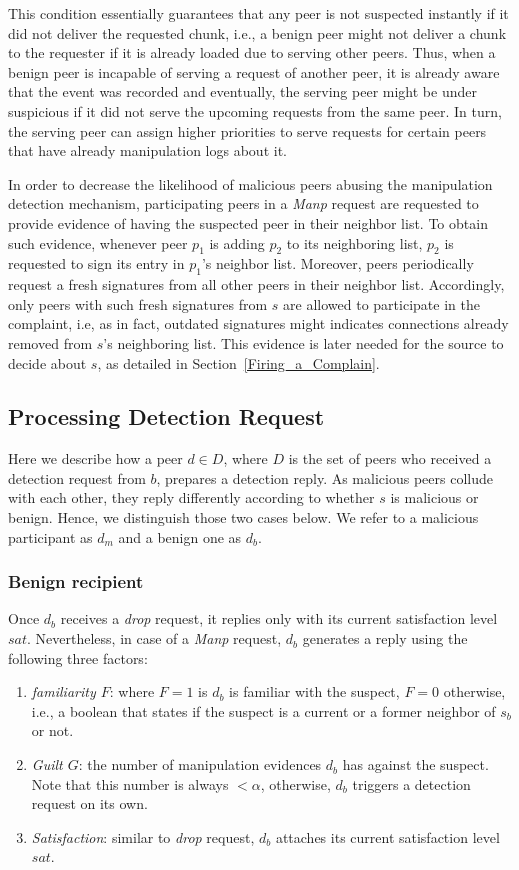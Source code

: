 This condition essentially guarantees that any peer is not suspected instantly if it did not deliver the requested chunk, i.e., a benign peer might not deliver a chunk to the requester if it is already loaded due to serving other peers.
Thus, when a benign peer is incapable of serving a request of another peer, it is already aware that the event was recorded and eventually, the serving peer might be under suspicious if it did not serve the upcoming requests from the same peer.
In turn, the serving peer can assign higher priorities to serve requests for certain peers that have already manipulation logs about it.

In order to decrease the likelihood of malicious peers abusing the manipulation detection mechanism, participating peers in a \textit{Manp} request are requested to provide evidence of having the suspected peer in their neighbor list.
To obtain such evidence, whenever peer $p_1$ is adding $p_2$ to its neighboring list, $p_2$ is requested to sign its entry in $p_1$'s neighbor list.
Moreover, peers periodically request a fresh signatures from all other peers in their neighbor list.
Accordingly, only peers with such fresh signatures from $s$ are allowed to participate in the complaint, i.e, as in fact, outdated signatures might indicates connections already removed from $s$'s neighboring list.
This evidence is later needed for the source to decide about $s$, as detailed in Section~\ref{Firing_a_Complain}.

\subsection{Processing Detection Request}
Here we describe how a peer $d \in D$, where $D$ is the set of peers who received a detection request from $b$, prepares a detection reply.
As malicious peers collude with each other, they reply differently according to whether $s$ is malicious or benign.
Hence, we distinguish those two cases below. We refer to a malicious participant as $d_m$ and a benign one as $d_b$.

\subsubsection*{Benign recipient}
Once $d_b$ receives a \textit{drop} request, it replies only with its current satisfaction level $sat$.
Nevertheless, in case of a \textit{Manp} request, $d_b$ generates a reply using the following three factors:
\begin{enumerate}
 \item \textit{familiarity $F$}: where $F=1$ is $d_b$ is familiar with the suspect, $F=0$ otherwise, i.e., a boolean that states if the suspect is a current or a former neighbor of $s_b$ or not.
 \item \textit{Guilt $G$}: the number of manipulation evidences $d_b$ has against the suspect.
 Note that this number is always $<\alpha$, otherwise, $d_b$ triggers a detection request on its own.
 \item \textit{Satisfaction}: similar to \textit{drop} request, $d_b$ attaches its current satisfaction level $sat$.
\end{enumerate}


